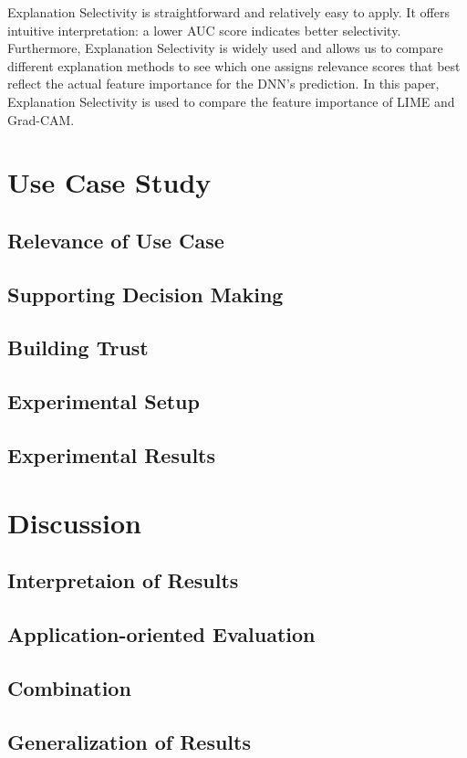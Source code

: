 \documentclass{article}
\begin{document}
Explanation Selectivity is straightforward and relatively easy to apply. It offers intuitive interpretation: a lower AUC score indicates better selectivity. Furthermore, Explanation Selectivity is widely used and allows us to compare different explanation methods to see which one assigns relevance scores that best reflect the actual feature importance for the DNN's prediction. In this paper, Explanation Selectivity is used to compare the feature importance of LIME and Grad-CAM.


\section{Use Case Study}
\subsection{Relevance of Use Case}
\subsection{Supporting Decision Making}
\subsection{Building Trust}
\subsection{Experimental Setup}
\subsection{Experimental Results}

\section{Discussion}
\subsection{Interpretaion of Results}
\subsection{Application-oriented Evaluation}
\subsection{Combination}
\subsection{Generalization of Results}
\end{document}
